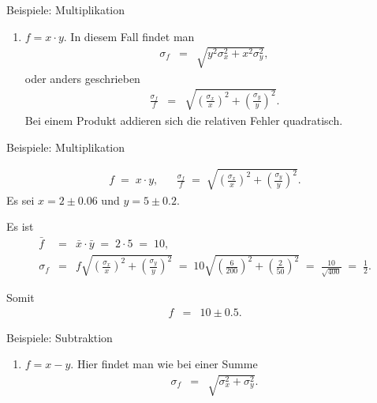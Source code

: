 \documentclass[german]{beamer}
\newcommand{\bq}{\begin{eqnarray*}}
\newcommand{\eq}{\end{eqnarray*}}
\begin{document}
\begin{frame}{Beispiele: Multiplikation}

\begin{enumerate}[2]

\item $f = x \cdot y$. In diesem Fall findet man
\bq 
\sigma_f & = & \sqrt{y^2 \sigma_x^2 + x^2 \sigma_y^2},
\eq
oder anders geschrieben
\bq
 \frac{\sigma_f}{f} & = & \sqrt{ \left(\frac{\sigma_x}{x}\right)^2 + \left(\frac{\sigma_y}{y}\right)^2 }.
\eq
Bei einem Produkt addieren sich die relativen Fehler quadratisch.

\end{enumerate}

\end{frame}

\begin{frame}{Beispiele: Multiplikation}

\begin{example}
\bq
 f \; = \; x \cdot y,
 & & 
 \frac{\sigma_f}{f} \; = \; \sqrt{ \left(\frac{\sigma_x}{x}\right)^2 + \left(\frac{\sigma_y}{y}\right)^2 }.
\eq
Es sei $x=2\pm 0.06$ und $y=5\pm 0.2$.

\vspace*{5mm}
Es ist
{\footnotesize
\bq
 \bar{f} & = & \bar{x} \cdot \bar{y} \; = \; 2 \cdot 5 \; = \; 10,
 \nonumber \\
 \sigma_f & = & f \sqrt{ \left(\frac{\sigma_x}{x}\right)^2 + \left(\frac{\sigma_y}{y}\right)^2 } 
 \; = \; 
 10 \sqrt{ \left(\frac{6}{200}\right)^2 + \left(\frac{2}{50}\right)^2 }
 \; = \;
 \frac{10}{\sqrt{400}}
 \; = \; 
 \frac{1}{2}.
\eq
}

\vspace*{-2mm}
Somit
\bq
 f & = & 10 \pm 0.5.
\eq
\end{example}

\end{frame}

\begin{frame}{Beispiele: Subtraktion}

\begin{enumerate}[3]

\item $f=x-y$. Hier findet man wie bei einer Summe
\bq
 \sigma_f & = & \sqrt{\sigma_x^2 + \sigma_y^2}.
\eq

\end{enumerate}

\end{frame}
\end{document}
